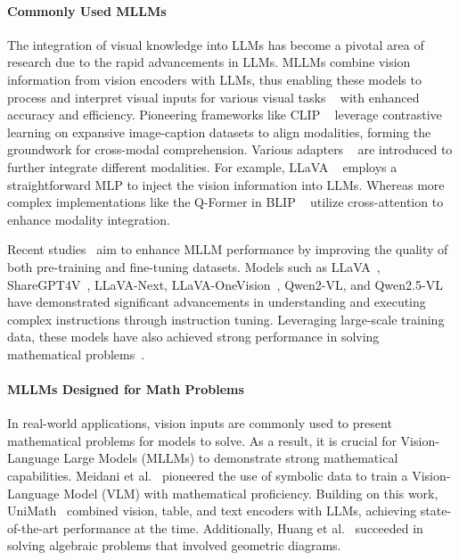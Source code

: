 \paragraph{Commonly Used MLLMs}
The integration of visual knowledge into LLMs has become a pivotal area of research due to the rapid advancements in LLMs. MLLMs combine vision information from vision encoders with LLMs, thus enabling these models to process and interpret visual inputs for various visual tasks ~\cite{dino,glipv2, grounded-pt} with enhanced accuracy and efficiency. Pioneering frameworks like CLIP ~\cite{clip} leverage contrastive learning on expansive image-caption datasets to align modalities, forming the groundwork for cross-modal comprehension. Various adapters ~\cite{llava, llava1.5,  blip, blip1, pformer, lyrics} are introduced to further integrate different modalities. For example, LLaVA ~\cite{llava, llava1.5} employs a straightforward MLP to inject the vision information into LLMs. Whereas more complex implementations like the Q-Former in BLIP ~\cite{blip1, blip} utilize cross-attention to enhance modality integration. 

Recent studies~\cite{image-text-data, sharegpt4v, llava, llava1.5, otter, zhang2024critic, zhuang2024math, luo2025ursa} aim to enhance MLLM performance by improving the quality of both pre-training and fine-tuning datasets. Models such as LLaVA~\cite{llava, llava1.5}, ShareGPT4V~\cite{sharegpt4v}, LLaVA-Next, LLaVA-OneVision~\cite{llava, llava1.5}, Qwen2-VL, and Qwen2.5-VL~\cite{bai2023qwenvl} have demonstrated significant advancements in understanding and executing complex instructions through instruction tuning. Leveraging large-scale training data, these models have also achieved strong performance in solving mathematical problems~\cite{lu2023mathvista}.

\paragraph{MLLMs Designed for Math Problems}
In real-world applications, vision inputs are commonly used to present mathematical problems for models to solve. As a result, it is crucial for Vision-Language Large Models (MLLMs) to demonstrate strong mathematical capabilities. Meidani et al.~\cite{meidani2023snip} pioneered the use of symbolic data to train a Vision-Language Model (VLM) with mathematical proficiency. Building on this work, UniMath~\cite{liang2023unimath} combined vision, table, and text encoders with LLMs, achieving state-of-the-art performance at the time. Additionally, Huang et al.~\cite{huang2024hologram} succeeded in solving algebraic problems that involved geometric diagrams.

